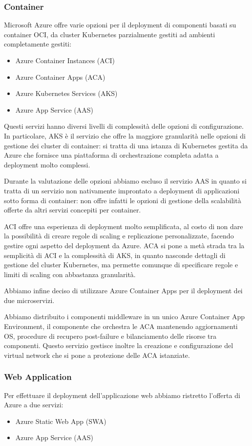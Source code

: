 \subsubsection{Container}
Microsoft Azure offre varie opzioni per il deployment di componenti basati su container OCI, da cluster Kubernetes parzialmente gestiti ad ambienti completamente gestiti:
\begin{itemize}
    \item Azure Container Instances (ACI)
    \item Azure Container Apps (ACA)
    \item Azure Kubernetes Services (AKS)
    \item Azure App Service (AAS)
\end{itemize}

Questi servizi hanno diversi livelli di complessità delle opzioni di configurazione. In particolare, AKS è il servizio che offre la maggiore granularità nelle opzioni di gestione dei cluster di container: si tratta di una istanza di Kubernetes gestita da Azure che fornisce una piattaforma di orchestrazione completa adatta a deployment molto complessi.

Durante la valutazione delle opzioni abbiamo escluso il servizio AAS in quanto si tratta di un servizio non nativamente improntato a deployment di applicazioni sotto forma di container: non offre infatti le opzioni di gestione della scalabilità offerte da altri servizi concepiti per container.

ACI offre una esperienza di deployment molto semplificata, al costo di non dare la possibilità di creare regole di scaling e replicazione personalizzate, facendo gestire ogni aspetto del deployment da Azure. ACA si pone a metà strada tra la semplicità di ACI e la complessità di AKS, in quanto nasconde dettagli di gestione del cluster Kubernetes, ma permette comunque di specificare regole e limiti di scaling con abbastanza granularità.

Abbiamo infine deciso di utilizzare Azure Container Apps per il deployment dei due microservizi.

Abbiamo distribuito i componenti middleware in un unico Azure Container App Environment, il componente che orchestra le ACA mantenendo aggiornamenti OS, procedure di recupero post-failure e bilanciamento delle risorse tra componenti. Questo servizio gestisce inoltre la creazione e configurazione del virtual network che si pone a protezione delle ACA istanziate.

\subsubsection{Web Application}
Per effettuare il deployment dell'applicazione web abbiamo ristretto l'offerta di Azure a due servizi:
\begin{itemize}
    \item Azure Static Web App (SWA)
    \item Azure App Service (AAS)
\end{itemize}

